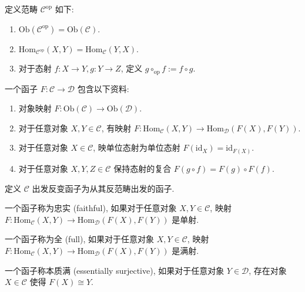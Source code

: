 \begin{definition}[反范畴]
    定义范畴 \(\mathcal{C}^{\mathrm{op}}\) 如下:

    \begin{enumerate}
        \item \(\mathrm{Ob} (\mathcal{C}^{\mathrm{op}}) = \mathrm{Ob} (\mathcal{C})\).
        \item \(\mathrm{Hom}_{\mathcal{C}^{\mathrm{op}}} (X,Y) = \mathrm{Hom}_{\mathcal{C}} (Y,X)\).
        \item 对于态射 \(f : X \to Y, g : Y \to Z\), 定义 \(g \circ_{\mathrm{op}} f := f \circ g\).
    \end{enumerate}
\end{definition}

\begin{definition}[函子]
    \label {definition:functor}
    一个函子 \(F : \mathcal{C} \to \mathcal{D}\) 包含以下资料:

    \begin{enumerate}
        \item 对象映射 \(F : \mathrm{Ob} (\mathcal{C}) \to \mathrm{Ob} (\mathcal{D})\).
        \item 对于任意对象 \(X,Y \in \mathcal{C}\), 有映射 \(F : \mathrm{Hom}_{\mathcal{C}} (X,Y) \to \mathrm{Hom}_{\mathcal{D}} (F(X),F(Y))\).
        \item 对于任意对象 \(X \in \mathcal{C}\), 映单位态射为单位态射 \(F(\mathrm{id}_X) = \mathrm{id}_{F(X)}\).
        \item 对于任意对象 \(X,Y,Z \in \mathcal{C}\) 保持态射的复合 \(F(g \circ f) = F(g) \circ F(f)\).
    \end{enumerate}
\end{definition}

\begin{definition}[反变函子]
    定义 \(\mathcal{C}\) 出发反变函子为从其反范畴出发的函子.
\end{definition}

\begin{definition}
    一个函子称为忠实 (faithful), 如果对于任意对象 \(X,Y \in \mathcal{C}\), 映射 \(F : \mathrm{Hom}_{\mathcal{C}} (X,Y) \to \mathrm{Hom}_{\mathcal{D}} (F(X),F(Y))\) 是单射.

    一个函子称为全 (full), 如果对于任意对象 \(X,Y \in \mathcal{C}\), 映射 \(F : \mathrm{Hom}_{\mathcal{C}} (X,Y) \to \mathrm{Hom}_{\mathcal{D}} (F(X),F(Y))\) 是满射.

    一个函子称本质满 (essentially surjective), 如果对于任意对象 \(Y \in \mathcal{D}\), 存在对象 \(X \in \mathcal{C}\) 使得 \(F(X) \cong Y\).
\end{definition}

